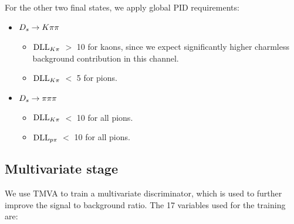 For the other two final states, we apply global PID requirements:



\begin{itemize}

\item  ${{D}_{s}}\rightarrow{\ensuremath{K}}{\ensuremath{\pi}}{\ensuremath{\pi}}$

\begin{itemize}

\item  $\mathrm{DLL}_{{K}{\pi}}$ $>$ 10 for kaons, since we expect significantly higher charmless background contribution in this channel. 

\item  $\mathrm{DLL}_{{K}{\pi}}$ $<$ 5 for pions.

\end{itemize}

\item ${{D}_{s}}\rightarrow{\ensuremath{\pi}}{\ensuremath{\pi}}{\ensuremath{\pi}}$

\begin{itemize}

\item $\mathrm{DLL}_{{K}{\pi}}$ $<$ 10 for all pions.

\item $\mathrm{DLL}_{{p}{\pi}}$ $<$ 10 for all pions.

\end{itemize}

\end{itemize}




\subsection{Multivariate stage}

We use TMVA \cite{Hocker:2007ht} to train a multivariate discriminator, which is used to further improve the signal to background ratio. 
The 17 variables used for the training are:


